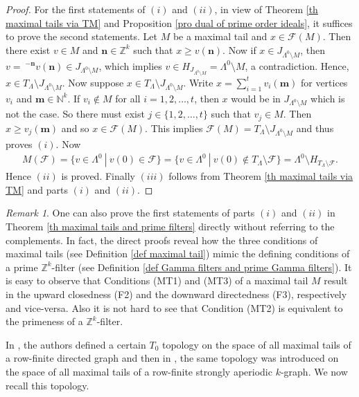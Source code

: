 \documentclass[a4paper,reqno,12pt]{amsart}
\numberwithin{equation}{section}
\theoremstyle{definition}
\theoremstyle{remark}
\newtheorem{rmk}[thm]{Remark}
\newcommand{\N}{\mathbf{n}}
\newcommand{\M}{\mathbf{m}}
\begin{document}
\begin{proof}
For the first statements of $(i)$ and $(ii)$, in view of Theorem \ref{th maximal tails via TM} and Proposition \ref{pro dual of prime order ideals}, it suffices to prove the second statements. Let $M$ be a maximal tail and $x\in \mathcal{F}(M)$. Then there exist $v\in M$ and $\N\in \mathbb{Z}^k$ such that $x\ge v(\N)$. Now if $x\in J_{\Lambda^0\setminus M}$, then $v=~^{-\N}v(\N)\in J_{\Lambda^0\setminus M}$, which implies $v\in H_{J_{\Lambda^0\setminus M}}=\Lambda^0\setminus M$, a contradiction. Hence, $x\in T_\Lambda\setminus J_{\Lambda^0\setminus M}$. Now suppose $x\in T_\Lambda\setminus J_{\Lambda^0\setminus M}$. Write $x=\displaystyle{\sum_{i=1}^{t}}v_i(\M)$ for vertices $v_i$ and $\M\in \mathbb{N}^k$. If $v_i\notin M$ for all $i=1,2,\ldots,t$, then $x$ would be in $J_{\Lambda^0\setminus M}$ which is not the case. So there must exist $j\in \{1,2,\ldots,t\}$ such that $v_j\in M$. Then $x\ge v_j(\M)$ and so $x\in \mathcal{F}(M)$. This implies $\mathcal{F}(M)=T_\Lambda\setminus J_{\Lambda^0\setminus M}$ and thus proves $(i)$. Now 
\begin{align*}
M(\mathcal{F})=\{v\in \Lambda^0~|~v(0)\in \mathcal{F}\}=\{v\in \Lambda^0~|~v(0)\notin T_\Lambda\setminus \mathcal{F}\}=\Lambda^0\setminus H_{T_\Lambda\setminus \mathcal{F}}.
\end{align*} 
Hence $(ii)$ is proved. Finally $(iii)$ follows from Theorem \ref{th maximal tails via TM} and parts $(i)$ and $(ii)$. 
\end{proof}

\begin{rmk}\label{rem maximal tail axioms resemble prime filters}
One can also prove the first statements of parts $(i)$ and $(ii)$ in Theorem \ref{th maximal tails and prime filters} directly without referring to the complements. In fact, the direct proofs reveal how the three conditions of maximal tails (see Definition \ref{def maximal tail}) mimic the defining conditions of a prime $\mathbb{Z}^k$-filter (see Definition \ref{def Gamma filters and prime Gamma filters}). It is easy to observe that Conditions (MT1) and (MT3) of a maximal tail $M$ result in the upward closedness (F2) and the downward directedness (F3), respectively and vice-versa. Also it is not hard to see that Condition (MT2) is equivalent to the primeness of a $\mathbb{Z}^k$-filter.
\end{rmk}

In \cite{BPRS}, the authors defined a certain $T_0$ topology on the space of all maximal tails of a row-finite directed graph and then in \cite{KangPask}, the same topology was introduced on the space of all maximal tails of a row-finite strongly aperiodic $k$-graph. We now recall this topology.
\end{document}
